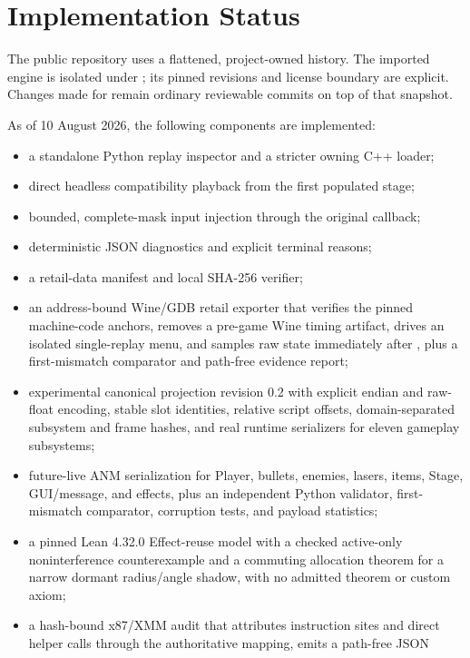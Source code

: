 \section{Implementation Status}

The public repository uses a flattened, project-owned history.  The imported
engine is isolated under ; its pinned revisions and license
boundary are explicit.  Changes made for \project{} remain ordinary reviewable
commits on top of that snapshot.

As of 10 August 2026, the following components are implemented:

\begin{itemize}
  \item a standalone Python replay inspector and a stricter owning C++ loader;
  \item direct headless compatibility playback from the first populated stage;
  \item bounded, complete-mask input injection through the original callback;
  \item deterministic JSON diagnostics and explicit terminal reasons;
  \item a retail-data manifest and local SHA-256 verifier;
  \item an address-bound Wine/GDB retail exporter that verifies the pinned
  machine-code anchors, removes a pre-game Wine timing artifact, drives an
  isolated single-replay menu, and samples raw state immediately after
  , plus a first-mismatch comparator and path-free
  evidence report;
  \item experimental canonical projection revision 0.2 with explicit endian
  and raw-float encoding, stable slot identities, relative script offsets,
  domain-separated subsystem and frame hashes, and real runtime serializers
  for eleven gameplay subsystems;
  \item future-live ANM serialization for Player, bullets, enemies, lasers,
  items, Stage, GUI/message, and effects, plus an independent Python validator,
  first-mismatch comparator, corruption tests, and payload statistics;
  \item a pinned Lean 4.32.0 Effect-reuse model with a checked active-only
  noninterference counterexample and a commuting allocation theorem for a
  narrow dormant radius/angle shadow, with no admitted theorem or custom axiom;
  \item a hash-bound x87/XMM audit that attributes instruction sites and direct
  helper calls through the authoritative mapping, emits a path-free JSON

\end{itemize}
